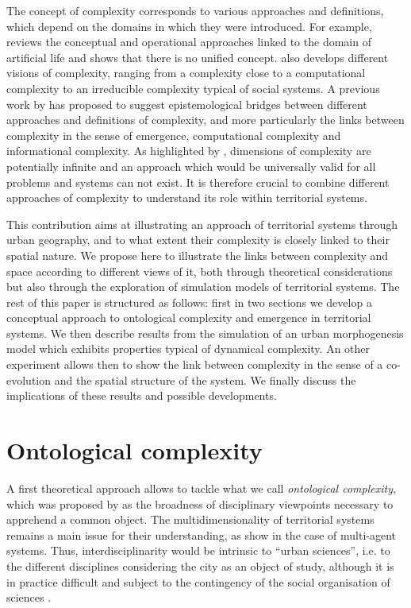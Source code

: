 \documentclass[11pt]{article}
\begin{document}
The concept of complexity corresponds to various approaches and definitions, which depend on the domains in which they were introduced. For example, \cite{chu2008criteria} reviews the conceptual and operational approaches linked to the domain of artificial life and shows that there is no unified concept. \cite{deffuant2015visions} also develops different visions of complexity, ranging from a complexity close to a computational complexity to an irreducible complexity typical of social systems. A previous work by \cite{raimbault2018relating} has proposed to suggest epistemological bridges between different approaches and definitions of complexity, and more particularly the links between complexity in the sense of emergence, computational complexity and informational complexity. As highlighted by \cite{batty2018defining}, dimensions of complexity are potentially infinite and an approach which would be universally valid for all problems and systems can not exist. It is therefore crucial to combine different approaches of complexity to understand its role within territorial systems.

This contribution aims at illustrating an approach of territorial systems through urban geography, and to what extent their complexity is closely linked to their spatial nature. We propose here to illustrate the links between complexity and space according to different views of it, both through theoretical considerations but also through the exploration of simulation models of territorial systems. The rest of this paper is structured as follows: first in two sections we develop a conceptual approach to ontological complexity and emergence in territorial systems. We then describe results from the simulation of an urban morphogenesis model which exhibits properties typical of dynamical complexity. An other experiment allows then to show the link between complexity in the sense of a co-evolution and the spatial structure of the system. We finally discuss the implications of these results and possible developments.


\section{Ontological complexity}


A first theoretical approach allows to tackle what we call \emph{ontological complexity}, which was proposed by \cite{pumain2003approche} as the broadness of disciplinary viewpoints necessary to apprehend a common object. The multidimensionality of territorial systems remains a main issue for their understanding, as show \cite{perez2016agent} in the case of multi-agent systems. Thus, interdisciplinarity would be intrinsic to ``urban sciences'', i.e. to the different disciplines considering the city as an object of study, although it is in practice difficult and subject to the contingency of the social organisation of sciences \citep{dupuy2015sciences}.
\end{document}
